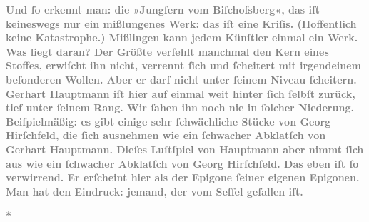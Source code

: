 \pstart
           \textcolor{gray}{\textbf{Und ſo erkennt man: die »Jungfern vom Biſchofsberg«, das iſt keineswegs nur ein mißlungenes Werk:
                  das iſt eine Kriſis. (Hoffentlich keine Katastrophe.) Mißlingen kann jedem
                  Künſtler einmal ein Werk. Was liegt daran? Der Größte verfehlt manchmal den Kern
                  eines Stoffes, erwiſcht ihn nicht, verrennt ſich und ſcheitert mit irgendeinem
                  beſonderen Wollen. Aber er darf nicht unter ſeinem Niveau ſcheitern. Gerhart Hauptmann iſt hier auf einmal weit
                  hinter ſich ſelbſt zurück, tief unter ſeinem Rang. Wir ſahen ihn noch nie in
                  ſolcher Niederung. Beiſpielmäßig: es gibt einige sehr ſchwächliche Stücke von Georg Hirſchfeld, die ſich ausnehmen wie ein
                  ſchwacher Abklatſch von Gerhart Hauptmann.
                  Dieſes Luſtſpiel von Hauptmann aber nimmt ſich aus wie ein
                  ſchwacher Abklatſch von Georg Hirſchfeld.
                  Das eben iſt ſo verwirrend. Er erſcheint hier als der Epigone ſeiner eigenen
                  Epigonen. Man hat den Eindruck: jemand, der vom Seſſel gefallen iſt.}}\pend
           
\pstart
           \centering{}\textcolor{gray}{\textbf{*}}\pend
           
